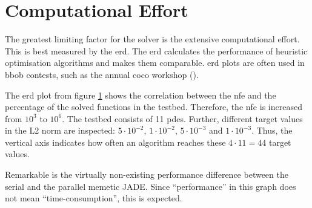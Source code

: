 \documentclass[./\jobname.tex]{subfiles}
\begin{document}
\section{Computational Effort}
\label{chap:computational_effort}

The greatest limiting factor for the solver is the extensive computational effort. This is best measured by the \gls{erd}. The \gls{erd} calculates the performance of heuristic optimisation algorithms and makes them comparable. \gls{erd} plots are often used in \gls{bbob} contests, such as the annual \gls{coco} workshop (\cite{nikolaus_hansen_2019_2594848}).

The \gls{erd} plot from figure \ref{fig:ert_plot} shows the correlation between the \gls{nfe} and the percentage of the solved functions in the testbed. Therefore, the \gls{nfe} is increased from $10^3$ to $10^6$. The testbed consists of 11 \gls{pde}s. Further, different target values in the L2 norm are inspected: $5\cdot 10^{-2}$, $1\cdot 10^{-2}$, $5\cdot 10^{-3}$ and $1\cdot 10^{-3}$. Thus, the vertical axis indicates how often an algorithm reaches these $4 \cdot 11 = 44$ target values. 

\begin{figure}[H]
	\centering
	\noindent{}
	\label{fig:ert_plot}
\end{figure}

Remarkable is the virtually non-existing performance difference between the serial and the parallel memetic JADE. Since ``performance'' in this graph does not mean ``time-consumption'', this is expected.
\end{document}
